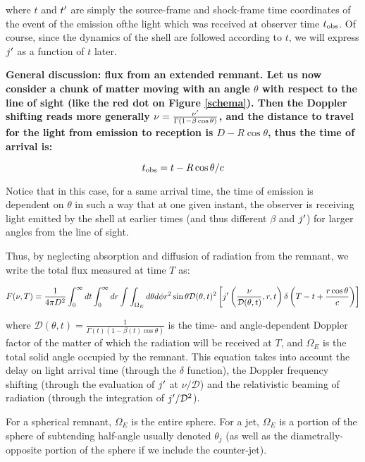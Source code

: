 where $t$ and $t^{\prime}$ are simply the source-frame and shock-frame time coordinates of the event of the emission ofthe light which was received at observer time ${t_{\mathrm{obs}}}$. Of course, since the dynamics of the shell are followed according to $t$, we will express $j^{\prime}$ as a function of $t$ later.

\bf{General discussion: flux from an extended remnant.} Let us now consider a chunk of matter moving with an angle $\theta$ with respect to the line of sight (like the red dot on Figure \ref{schema}). Then the Doppler shifting reads more generally $\nu = \frac{\nu^{\prime}}{\Gamma (1 - \beta \cos \theta)}$, and the distance to travel for the light from emission to reception is $D - R \cos \theta$, thus the time of arrival is:

\begin{equation}
{t_{\mathrm{obs}}} = t - R \cos \theta / c
\end{equation}

Notice that in this case, for a same arrival time, the time of emission is dependent on $\theta$ in such a way that at one given instant, the observer is receiving light emitted by the shell at earlier times (and thus different $\beta$ and $j^{\prime}$) for larger angles from the line of sight.

Thus, by neglecting absorption and diffusion of radiation from the remnant, we write the total flux measured at time $T$ as:


\begin{equation}\label{in}
    F(\nu, T) = \frac{1}{4\pi D ^ 2}\int_0^{\infty} dt \int_0^\infty dr \int \int_{\Omega_E} d\theta d\phi r^2 \sin \theta \mathcal{D}(\theta, t)^2 \left[ j^{\prime}\left(\frac{\nu}{\mathcal{D}(\theta, t)}, r, t\right) \delta\left(T - t + \frac{r\cos\theta}{c}\right) \right]
\end{equation}


where $\mathcal{D}(\theta, t) = \frac{1}{\Gamma(t)(1 - \beta(t) \cos \theta)}$ is the time- and angle-dependent Doppler factor of the matter of which the radiation will be received at $T$, and $\Omega_E$ is the total solid angle occupied by the remnant. This equation takes into account the delay on light arrival time (through the $\delta$ function), the Doppler frequency shifting (through the evaluation of $j^{\prime}$ at $\nu/\mathcal{D}$) and the relativistic beaming of radiation (through the integration of $j^{\prime}/\mathcal{D}^2$).

For a spherical remnant, $\Omega_E$ is the entire sphere. For a jet, $\Omega_E$ is a portion of the sphere of subtending half-angle usually denoted $\theta_j$ (as well as the diametrally-opposite portion of the sphere if we include the counter-jet).

